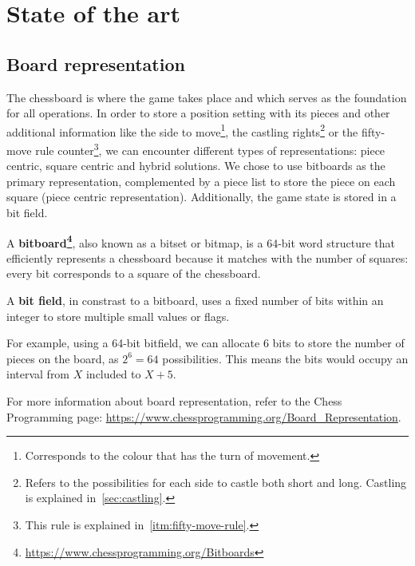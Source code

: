 \chapter{State of the art}
\label{cap:estadoDeLaCuestion}

\section{Board representation}

The chessboard is where the game takes place and which serves as the foundation for all operations. In order to store a position setting with its pieces and other additional information like the side to move\footnote{Corresponds to the colour that has the turn of movement.}, the castling rights\footnote{Refers to the possibilities for each side to castle both short and long. Castling is explained in~\ref{sec:castling}.} or the fifty-move rule counter\footnote{This rule is explained in~\ref{itm:fifty-move-rule}.}, we can encounter different types of representations: piece centric, square centric and hybrid solutions. We chose to use bitboards as the primary representation, complemented by a piece list to store the piece on each square (piece centric representation). Additionally, the game state is stored in a bit field.

\vspace{1em}

A \textbf{bitboard\footnote{\url{https://www.chessprogramming.org/Bitboards}}}, also known as a bitset or bitmap, is a 64-bit word structure that efficiently represents a chessboard because it matches with the number of squares: every bit corresponds to a square of the chessboard.

\vspace{1em}

A \textbf{bit field}, in constrast to a bitboard, uses a fixed number of bits within an integer to store multiple small values or flags.

\vspace{1em}

For example, using a 64-bit bitfield, we can allocate 6 bits to store the number of pieces on the board, as $2^6 = 64$ possibilities. This means the bits would occupy an interval from $X$ included to $X+5$.

\vspace{1em}

For more information about board representation, refer to the Chess Programming page: \url{https://www.chessprogramming.org/Board_Representation}.

